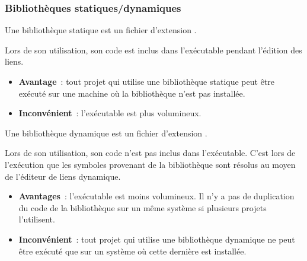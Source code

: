 \begin{frame}[fragile]
\frametitle{Bibliothèques statiques/dynamiques}
Une \alert{bibliothèque statique} est un fichier d'extension .
\medskip

Lors de son utilisation, son code est inclus dans l'exécutable pendant
l'édition des liens.
\begin{itemize}
    \item {\bf Avantage}~: tout projet qui utilise une bibliothèque
    statique peut être exécuté sur une machine où la bibliothèque n'est
    pas installée.
    \item {\bf Inconvénient}~: l'exécutable est plus volumineux.
\end{itemize}
\bigskip
\bigskip

Une \alert{bibliothèque dynamique} est un fichier d'extension .
\medskip

Lors de son utilisation, son code n'est pas inclus dans l'exécutable.
C'est lors de l'exécution que les symboles provenant de la bibliothèque
sont résolus au moyen de l'éditeur de liens dynamique.
\begin{itemize}
    \item {\bf Avantages}~: l'exécutable est moins volumineux. Il n'y a
    pas de duplication du code de la bibliothèque sur un même système si
    plusieurs projets l'utilisent.
    \item {\bf Inconvénient}~: tout projet qui utilise une bibliothèque
    dynamique ne peut être exécuté que sur un système où cette
    dernière est installée.
\end{itemize}
\end{frame}

